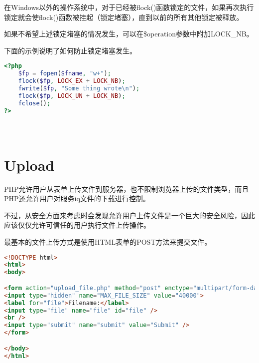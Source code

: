 在Windows以外的操作系统中，对于已经被flock()函数锁定的文件，如果再次执行锁定就会使flock()函数被挂起（锁定堵塞），直到以前的所有其他锁定被释放。

如果不希望上述锁定堵塞的情况发生，可以在\$operation参数中附加LOCK\_NB。

下面的示例说明了如何防止锁定堵塞发生。


\begin{lstlisting}[language=PHP]
<?php
	$fp = fopen($fname, "w+");
	flock($fp, LOCK_EX + LOCK_NB);
	fwrite($fp, "Some thing wrote\n");
	flock($fp, LOCK_UN + LOCK_NB);
	fclose();
?>
\end{lstlisting}




\begin{lstlisting}[language=PHP]

\end{lstlisting}




\begin{lstlisting}[language=PHP]

\end{lstlisting}




\begin{lstlisting}[language=PHP]

\end{lstlisting}

\section{Upload}





PHP允许用户从表单上传文件到服务器，也不限制浏览器上传的文件类型，而且PHP还允许用户对服务iq文件的下载进行控制。

不过，从安全方面来考虑时会发现允许用户上传文件是一个巨大的安全风险，因此应该仅仅允许可信任的用户执行文件上传操作。


最基本的文件上传方式是使用HTML表单的POST方法来提交文件。




\begin{lstlisting}[language=HTML]
<!DOCTYPE html>
<html>
<body>

<form action="upload_file.php" method="post" enctype="multipart/form-data">
<input type="hidden" name="MAX_FILE_SIZE" value="40000">
<label for="file">Filename:</label>
<input type="file" name="file" id="file" /> 
<br />
<input type="submit" name="submit" value="Submit" />
</form>

</body>
</html>
\end{lstlisting}

